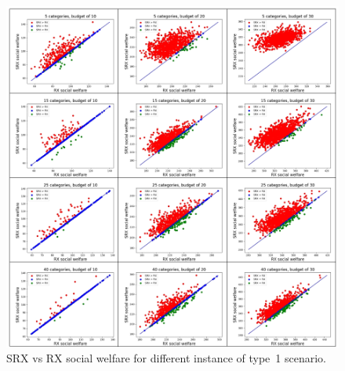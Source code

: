 \documentclass[runningheads]{llncs}
\begin{document}
\begin{subappendices}
\begin{figure}[t]
\begin{center}
\includegraphics[width=14cm]{simulation/unit_scatters_no_prob.png}
\caption{SRX vs RX social welfare for different instance of type~1 scenario.
}\label{fig:scatter_all1}
\end{center}
\end{figure}


\end{subappendices}
\end{document}
